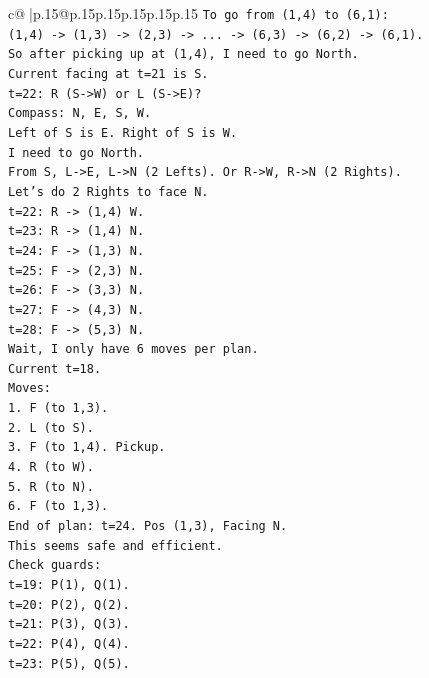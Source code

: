 \documentclass{article}
\begin{document}
{\begin{supertabular}{c@{$\;$}|p{.15\linewidth}@{}p{.15\linewidth}p{.15\linewidth}p{.15\linewidth}p{.15\linewidth}p{.15\linewidth}}
{{{\texttt{To go from (1,4) to (6,1):} \\
\texttt{(1,4) {-}> (1,3) {-}> (2,3) {-}> ... {-}> (6,3) {-}> (6,2) {-}> (6,1).} \\
\texttt{So after picking up at (1,4), I need to go North.} \\
\texttt{Current facing at t=21 is S.} \\
\texttt{t=22: R (S{-}>W) or L (S{-}>E)?} \\
\texttt{Compass: N, E, S, W.} \\
\texttt{Left of S is E. Right of S is W.} \\
\texttt{I need to go North.} \\
\texttt{From S, L{-}>E, L{-}>N (2 Lefts). Or R{-}>W, R{-}>N (2 Rights).} \\
\texttt{Let's do 2 Rights to face N.} \\
\texttt{t=22: R {-}> (1,4) W.} \\
\texttt{t=23: R {-}> (1,4) N.} \\
\texttt{t=24: F {-}> (1,3) N.} \\
\texttt{t=25: F {-}> (2,3) N.} \\
\texttt{t=26: F {-}> (3,3) N.} \\
\texttt{t=27: F {-}> (4,3) N.} \\
\texttt{t=28: F {-}> (5,3) N.} \\
\texttt{Wait, I only have 6 moves per plan.} \\
\texttt{Current t=18.} \\
\texttt{Moves:} \\
\texttt{1. F (to 1,3).} \\
\texttt{2. L (to S).} \\
\texttt{3. F (to 1,4). Pickup.} \\
\texttt{4. R (to W).} \\
\texttt{5. R (to N).} \\
\texttt{6. F (to 1,3).} \\
\texttt{End of plan: t=24. Pos (1,3), Facing N.} \\
\texttt{This seems safe and efficient.} \\
\texttt{Check guards:} \\
\texttt{t=19: P(1), Q(1).} \\
\texttt{t=20: P(2), Q(2).} \\
\texttt{t=21: P(3), Q(3).} \\
\texttt{t=22: P(4), Q(4).} \\
\texttt{t=23: P(5), Q(5).} \\
}}}
\end{supertabular}}
\end{document}
